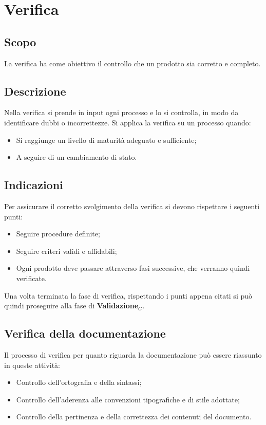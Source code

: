 \section{Verifica}
\subsection{Scopo}
La verifica ha come obiettivo il controllo che un prodotto sia corretto e completo.

\subsection{Descrizione}
Nella verifica si prende in input ogni processo e lo si controlla, in modo da identificare dubbi o incorrettezze.
Si applica la verifica su un processo quando:
\begin{itemize}
  \item Si raggiunge un livello di maturità adeguato e sufficiente;
  \item A seguire di un cambiamento di stato.
\end{itemize}

\subsection{Indicazioni}
Per assicurare il corretto svolgimento della verifica si devono rispettare i seguenti punti:
\begin{itemize}
  \item Seguire procedure definite;
  \item Seguire criteri validi e affidabili;
  \item Ogni prodotto deve passare attraverso fasi successive, che verranno quindi verificate.
\end{itemize}
Una volta terminata la fase di verifica, rispettando i punti appena citati si può quindi proseguire alla fase di \textbf{Validazione}$_G$.

\subsection{Verifica della documentazione}
Il processo di verifica per quanto riguarda la documentazione può essere riassunto in queste attività:
\begin{itemize}
  \item Controllo dell'ortografia e della sintassi;
  \item Controllo dell'aderenza alle convenzioni tipografiche e di stile adottate;
  \item Controllo della pertinenza e della correttezza dei contenuti del documento.
\end{itemize}

